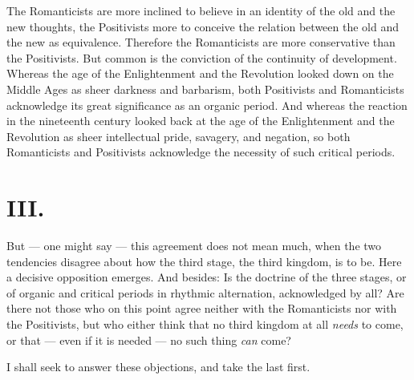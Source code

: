 \documentclass[12pt,a4paper,openany]{book}
\begin{document}
The Romanticists are more inclined to believe in an
identity of the old and the new thoughts, the Positivists more
to conceive the relation between the old and the new as
equivalence. Therefore the Romanticists are more conservative than
the Positivists. But common is the conviction of the
continuity of development. Whereas the age of the Enlightenment and the Revolution
looked down on the Middle Ages as sheer darkness and barbarism,
both Positivists and Romanticists acknowledge its great
significance as an organic period. And whereas the reaction in the
nineteenth century looked back at the age of the Enlightenment and the Revolution
as sheer intellectual pride, savagery, and negation, so
both Romanticists and Positivists acknowledge the necessity of such
critical periods.

\section*{III.}

But --- one might say --- this agreement does not mean
much, when the two tendencies disagree about how the
third stage, the third kingdom, is to be. Here a
decisive opposition emerges. And besides: Is the doctrine of the three
stages, or of organic and critical periods in rhythmic
alternation, acknowledged by all? Are there not those who on this
point agree neither with the Romanticists nor with the Positivists,
but who either think that no third kingdom at all \emph{needs}
to come, or that --- even if it is needed --- no
such thing \emph{can} come?

I shall seek to answer these objections, and take
the last first.
\end{document}
